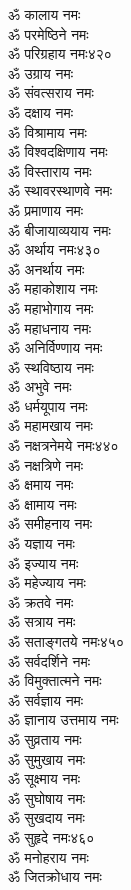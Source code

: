 \begin{center}
\begin{multicols}{2}
\begin{flushleft}
ॐ कालाय नमः\\
ॐ परमेष्ठिने नमः\\
ॐ परिग्रहाय नमः\hfill ४२०\\
ॐ उग्राय नमः\\
ॐ संवत्सराय नमः\\
ॐ दक्षाय नमः\\
ॐ विश्रामाय नमः\\
ॐ विश्वदक्षिणाय नमः\\
ॐ विस्ताराय नमः\\
ॐ स्थावरस्थाणवे नमः\\
ॐ प्रमाणाय नमः\\
ॐ बीजायाव्ययाय नमः\\
ॐ अर्थाय नमः\hfill ४३०\\
ॐ अनर्थाय नमः\\
ॐ महाकोशाय नमः\\
ॐ महाभोगाय नमः\\
ॐ महाधनाय नमः\\
ॐ अनिर्विण्णाय नमः\\
ॐ स्थविष्ठाय नमः\\
ॐ अभुवे नमः\\
ॐ धर्मयूपाय नमः\\
ॐ महामखाय नमः\\
ॐ नक्षत्रनेमये नमः\hfill ४४०\\
ॐ नक्षत्रिणे नमः\\
ॐ क्षमाय नमः\\
ॐ क्षामाय नमः\\
ॐ समीहनाय नमः\\
ॐ यज्ञाय नमः\\
ॐ इज्याय नमः\\
ॐ महेज्याय नमः\\
ॐ क्रतवे नमः\\
ॐ सत्राय नमः\\
ॐ सताङ्गतये नमः\hfill ४५०\\
ॐ सर्वदर्शिने नमः\\
ॐ विमुक्तात्मने नमः\\
ॐ सर्वज्ञाय नमः\\
ॐ ज्ञानाय उत्तमाय नमः\\
ॐ सुव्रताय नमः\\
ॐ सुमुखाय नमः\\
ॐ सूक्ष्माय नमः\\
ॐ सुघोषाय नमः\\
ॐ सुखदाय नमः\\
ॐ सुहृदे नमः\hfill ४६०\\
ॐ मनोहराय नमः\\
ॐ जितक्रोधाय नमः\\

\end{flushleft}
\end{multicols}
\end{center}
